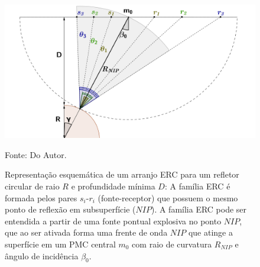 \begin{figure}[htb]
\caption{Representação esquemática de um arranjo ERC para um refletor circular de raio $R$ e profundidade
mínima $D$: A família ERC é formada pelos pares $s_i$-$r_i$ (fonte-receptor) que possuem o mesmo ponto de
reflexão em subsuperfície ($NIP$). A família ERC pode ser entendida a partir de uma fonte pontual explosiva
no ponto $NIP$, que ao ser ativada forma uma frente de onda $NIP$ que atinge a superfície em um PMC central 
$m_0$ com raio de curvatura $R_{NIP}$ e ângulo de incidência $\beta_0$.}
\begin{center}
\includegraphics[scale=0.3]{images/cre.png}
\vspace{-0.3cm}
\end{center}
\begin{center}
 Fonte: Do Autor.
\end{center}
\label{fig:4.1}
\end{figure}


